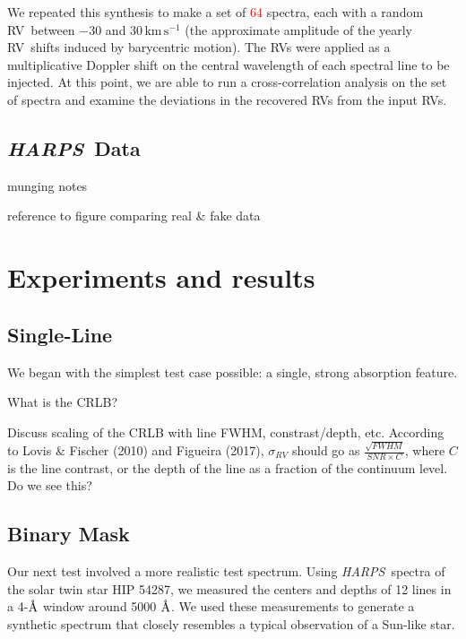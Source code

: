 \documentclass[modern]{aastex63}
\newcommand{\unit}[1]{\mathrm{#1}}
\newcommand{\km}{\unit{km}}
\newcommand{\s}{\unit{s}}
\newcommand{\kms}{\km\,\s^{-1}}
\newcommand{\ang}{\text{\normalfont\AA}}
\newcommand{\todo}[1]{\textcolor{red}{#1}}  %
\newcommand{\acronym}[1]{{\small{#1}}}
\newcommand{\project}[1]{\textsl{#1}}
\newcommand{\HARPS}{\project{\acronym{HARPS}}}
\newcommand{\RV}{\acronym{RV}}
\begin{document}
We repeated this synthesis to make a set of \todo{64} spectra, each with a random \RV\ between $-30$ and $30\,\kms$ (the approximate amplitude of the yearly \RV\ shifts induced by barycentric motion). 
The \RV s were applied as a multiplicative Doppler shift on the central wavelength of each spectral line to be injected. 
At this point, we are able to run a cross-correlation analysis on the set of spectra and examine the deviations in the recovered \RV s from the input \RV s.

\begin{figure}
\centering
\caption{}
\label{fig:spectra}
\end{figure}

\subsection{\HARPS\ Data}

munging notes

reference to figure comparing real \& fake data

\section{Experiments and results}
\label{s:experiments}

\subsection{Single-Line}
\label{s:singleline}

We began with the simplest test case possible: a single, strong absorption feature.

What is the CRLB?

Discuss scaling of the CRLB with line FWHM, constrast/depth, etc. According to Lovis \& Fischer (2010) and Figueira (2017), $\sigma_{RV}$ should go as $\frac{\sqrt{FWHM}}{SNR \times C}$, where $C$ is the line contrast, or the depth of the line as a fraction of the continuum level. Do we see this?

\subsection{Binary Mask}

Our next test involved a more realistic test spectrum. Using \HARPS\ spectra of the solar twin star HIP 54287, we measured the centers and depths of 12 lines in a 4-$\ang$ window around 5000 $\ang$. We used these measurements to generate a synthetic spectrum that closely resembles a typical observation of a Sun-like star.
\end{document}
